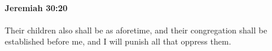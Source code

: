 
		\paragraph{Jeremiah 30:20} %
			\label{JEREMIAH-30-20}

			Their children also shall be as aforetime, and their congregation shall be established before me, and I will punish all that oppress them.



